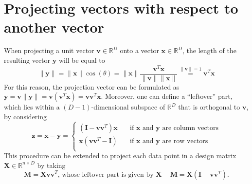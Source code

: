 \documentclass{report}
\begin{document}
\section{Projecting vectors with respect to another vector}
When projecting a unit vector $\displaystyle \mathbf{v} \in \mathbb{R}^D$ onto a vector $\displaystyle \mathbf{x} \in \mathbb{R}^D$, the length of the resulting vector $\displaystyle \mathbf{y}$ will be equal to
\[\lVert \mathbf{y} \rVert = \lVert \mathbf{x} \rVert\cos(\theta) = \lVert \mathbf{x} \rVert\frac{\mathbf{v}^T\mathbf{x}}{\lVert \mathbf{v} \rVert\lVert \mathbf{x} \rVert} \stackrel{\lVert \mathbf{v} \rVert = 1}{=} \mathbf{v}^T\mathbf{x}\]
For this reason, the projection vector can be formulated as $\displaystyle \mathbf{y} = \mathbf{v}\lVert \mathbf{y} \rVert = \mathbf{v}(\mathbf{v}^T\mathbf{x}) = \mathbf{vv}^T\mathbf{x}$. \newline
Moreover, one can define a ``leftover'' part, which lies within a $\displaystyle (D - 1)$-dimensional subspace of $\displaystyle \mathbb{R}^D$ that is orthogonal to $\displaystyle \mathbf{v}$, by considering
\[\mathbf{z} = \mathbf{x} - \mathbf{y} = \begin{cases}
    (\mathbf{I} - \mathbf{vv}^T)\mathbf{x} &\quad\text{if $\mathbf{x}$ and $\mathbf{y}$ are column vectors} \\
    \mathbf{x}(\mathbf{vv}^T - \mathbf{I}) &\quad\text{if $\mathbf{x}$ and $\mathbf{y}$ are row vectors} \\
\end{cases}\]
This procedure can be extended to project each data point in a design matrix $\displaystyle \mathbf{X} \in \mathbb{R}^{n \times D}$ by taking
\[\mathbf{M} = \mathbf{Xvv}^T \text{, whose leftover part is given by $\mathbf{X} - \mathbf{M} = \mathbf{X}(\mathbf{I} - \mathbf{vv}^T)$.}\]
\end{document}
